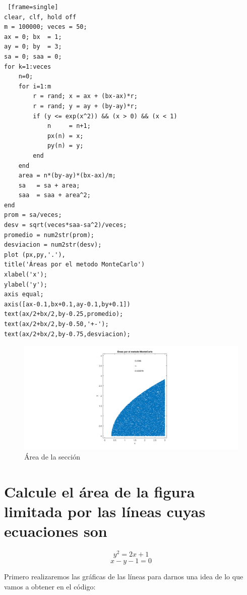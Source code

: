 \documentclass{article}
\begin{document}
\begin{lstlisting} [frame=single]
clear, clf, hold off
m = 100000; veces = 50;
ax = 0; bx  = 1;
ay = 0; by  = 3;
sa = 0; saa = 0;
for k=1:veces
    n=0;
    for i=1:m
        r = rand; x = ax + (bx-ax)*r;
        r = rand; y = ay + (by-ay)*r;
        if (y <= exp(x^2)) && (x > 0) && (x < 1)
            n     = n+1;
            px(n) = x; 
            py(n) = y;
        end
    end
    area = n*(by-ay)*(bx-ax)/m;
    sa   = sa + area;
    saa  = saa + area^2;
end
prom = sa/veces;
desv = sqrt(veces*saa-sa^2)/veces;
promedio = num2str(prom);
desviacion = num2str(desv);
plot (px,py,'.'),
title('Áreas por el metodo MonteCarlo') 
xlabel('x');
ylabel('y');
axis equal;
axis([ax-0.1,bx+0.1,ay-0.1,by+0.1])
text(ax/2+bx/2,by-0.25,promedio);
text(ax/2+bx/2,by-0.50,'+-');
text(ax/2+bx/2,by-0.75,desviacion);
\end{lstlisting}

\begin{figure}[H]
\centering
    \includegraphics[width=1\textwidth]{images/FIG02B.png}
    \caption{Área de la sección}
\end{figure}

\section{Calcule el área de la figura limitada por las líneas cuyas ecuaciones son}

\begin{equation}
y^2=2x+1
\end{equation}
\begin{equation}
x-y-1=0
\end{equation}

Primero realizaremos las gráficas de las líneas para darnos una idea de lo que vamos a obtener en el código:

\clearpage
\newpage
\end{document}
